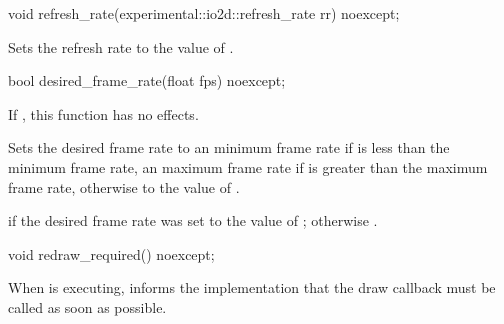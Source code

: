 %
\begin{itemdecl}
void refresh_rate(experimental::io2d::refresh_rate rr) noexcept;
\end{itemdecl}
\begin{itemdescr}
\pnum
\effects
Sets the refresh rate to the value of .
\end{itemdescr}

%
\begin{itemdecl}
bool desired_frame_rate(float fps) noexcept;
\end{itemdecl}
\begin{itemdescr}
\pnum
\effects
If , this function has no effects.

\pnum
Sets the desired frame rate to an  minimum frame rate if  is less than the minimum frame rate, an  maximum frame rate if  is greater than the maximum frame rate, otherwise to the value of .

\pnum
\returns
{} if the desired frame rate was set to the value of ; otherwise .
\end{itemdescr}

%
\begin{itemdecl}
void redraw_required() noexcept;
\end{itemdecl}
\begin{itemdescr}
\pnum
\effects
When  is executing, informs the implementation that the draw callback must be called as soon as possible.
\end{itemdescr}

